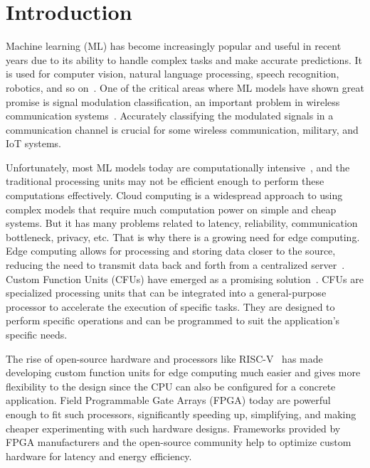 
\chapter{Introduction}
Machine learning (ML) has become increasingly popular and useful in recent years due to its ability to handle complex tasks and make accurate predictions. It is used for computer vision, natural language processing, speech recognition, robotics, and so on~\cite{ml_applications}. One of the critical areas where ML models have shown great promise is signal modulation classification, an important problem in wireless communication systems~\cite{darpa_ml_application}. Accurately classifying the modulated signals in a communication channel is crucial for some wireless communication, military, and IoT systems. 

Unfortunately, most ML models today are computationally intensive~\cite{models_require_alotf_of_computations}, and the traditional processing units may not be efficient enough to perform these computations effectively. Cloud computing is a widespread approach to using complex models that require much computation power on simple and cheap systems. But it has many problems related to latency, reliability, communication bottleneck, privacy, etc. That is why there is a growing need for edge computing. Edge computing allows for processing and storing data closer to the source, reducing the need to transmit data back and forth from a centralized server~\cite{edge_computing}. Custom Function Units (CFUs) have emerged as a promising solution~\cite{risc_v_cfu}. CFUs are specialized processing units that can be integrated into a general-purpose processor to accelerate the execution of specific tasks. They are designed to perform specific operations and can be programmed to suit the application's specific needs. 

The rise of open-source hardware and processors like RISC-V~\cite{risc_v_manual} has made developing custom function units for edge computing much easier and gives more flexibility to the design since the CPU can also be configured for a concrete application. Field Programmable Gate Arrays (FPGA) today are powerful enough to fit such processors, significantly speeding up, simplifying, and making cheaper experimenting with such hardware designs. Frameworks provided by FPGA manufacturers and the open-source community help to optimize custom hardware for latency and energy efficiency. 

